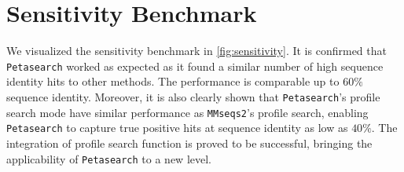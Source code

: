 \section{Sensitivity Benchmark}

We visualized the sensitivity benchmark in \autoref{fig:sensitivity}. It is confirmed that \texttt{Petasearch} worked as expected as it found a similar number of high sequence identity hits to other methods. The performance is comparable up to $60\%$ sequence identity. Moreover, it is also clearly shown that \texttt{Petasearch}'s profile search mode have similar performance as \texttt{MMseqs2}'s profile search, enabling \texttt{Petasearch} to capture true positive hits at sequence identity as low as $40\%$. The integration of profile search function is proved to be successful, bringing the applicability of \texttt{Petasearch} to a new level.

